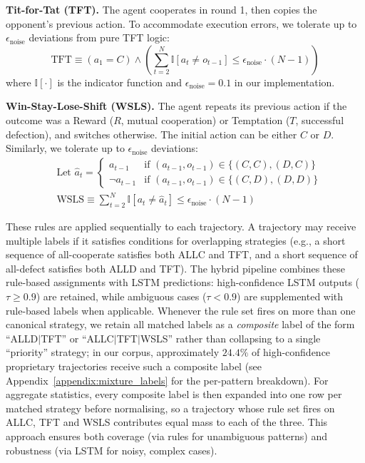 \documentclass[a4paper,fleqn]{cas-sc}
\begin{document}
\textbf{Tit-for-Tat (TFT).} The agent cooperates in round 1, then copies the opponent's previous action. To accommodate execution errors, we tolerate up to $\epsilon_{\text{noise}}$ deviations from pure TFT logic:
\[
\text{TFT} \equiv (a_1 = C) \land \left(\sum_{t=2}^{N} \mathbb{I}[a_t \neq o_{t-1}] \leq \epsilon_{\text{noise}} \cdot (N-1)\right)
\]
where $\mathbb{I}[\cdot]$ is the indicator function and $\epsilon_{\text{noise}} = 0.1$ in our implementation.

\textbf{Win-Stay-Lose-Shift (WSLS).} The agent repeats its previous action if the outcome was a Reward ($R$, mutual cooperation) or Temptation ($T$, successful defection), and switches otherwise. The initial action can be either $C$ or $D$. Similarly, we tolerate up to $\epsilon_{\text{noise}}$ deviations:
\begin{equation*}
\begin{split}
& \text{Let } \hat{a}_t =
    \begin{cases}
        a_{t-1} & \text{if } (a_{t-1}, o_{t-1}) \in \{(C,C), (D,C)\} \\
        \neg a_{t-1} & \text{if } (a_{t-1}, o_{t-1}) \in \{(C,D), (D,D)\}
    \end{cases} \\
& \text{WSLS} \equiv \sum_{t=2}^{N} \mathbb{I}\left[a_t \neq \hat{a}_t\right] \leq \epsilon_{\text{noise}} \cdot (N-1)
\end{split}
\end{equation*}

These rules are applied sequentially to each trajectory. A trajectory may receive multiple labels if it satisfies conditions for overlapping strategies (e.g., a short sequence of all-cooperate satisfies both ALLC and TFT, and a short sequence of all-defect satisfies both ALLD and TFT). The hybrid pipeline combines these rule-based assignments with LSTM predictions: high-confidence LSTM outputs ($\tau \ge 0.9$) are retained, while ambiguous cases ($\tau < 0.9$) are supplemented with rule-based labels when applicable. Whenever the rule set fires on more than one canonical strategy, we retain all matched labels as a \emph{composite} label of the form ``ALLD$|$TFT'' or ``ALLC$|$TFT$|$WSLS'' rather than collapsing to a single ``priority'' strategy; in our corpus, approximately $24.4\%$ of high-confidence proprietary trajectories receive such a composite label (see Appendix~\ref{appendix:mixture_labels} for the per-pattern breakdown). For aggregate statistics, every composite label is then expanded into one row per matched strategy before normalising, so a trajectory whose rule set fires on ALLC, TFT and WSLS contributes equal mass to each of the three. This approach ensures both coverage (via rules for unambiguous patterns) and robustness (via LSTM for noisy, complex cases).
\end{document}
